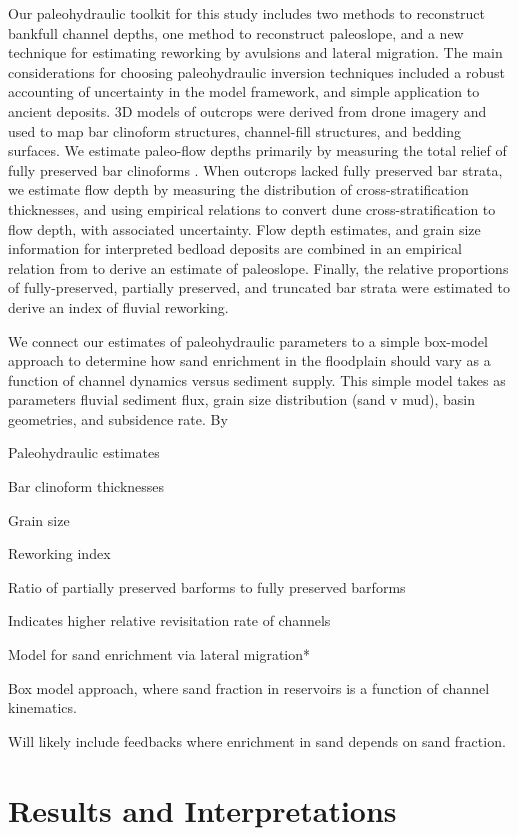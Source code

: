 \documentclass[draft]{compact_proposal}
\begin{document}
Our paleohydraulic toolkit for this study includes two methods to reconstruct bankfull channel depths, one method to reconstruct paleoslope, and a new technique for estimating reworking by avulsions and lateral migration.
The main considerations for choosing paleohydraulic inversion techniques included a robust accounting of uncertainty in the model framework, and simple application to ancient deposits.
3D models of outcrops were derived from drone imagery and used to map bar clinoform structures, channel-fill structures, and bedding surfaces.
We estimate paleo-flow depths primarily by measuring the total relief of fully preserved bar clinoforms .
When outcrops lacked fully preserved bar strata, we estimate flow depth by measuring the distribution of cross-stratification thicknesses, and using empirical relations to convert dune cross-stratification to flow depth, with associated uncertainty.
Flow depth estimates, and grain size information for interpreted bedload deposits are combined in an empirical relation from \cnote[trampush] to derive an estimate of paleoslope.
Finally, the relative proportions of fully-preserved, partially preserved, and truncated bar strata were estimated to derive an index of fluvial reworking.

We connect our estimates of paleohydraulic parameters to a simple box-model approach to determine how sand enrichment in the floodplain should vary as a function of channel dynamics versus sediment supply.
This simple model takes as parameters fluvial sediment flux, grain size distribution (sand v mud), basin geometries, and subsidence rate.
By 

Paleohydraulic estimates

  Bar clinoform thicknesses

  Grain size

  Reworking index

    Ratio of partially preserved barforms to fully preserved barforms

    Indicates higher relative revisitation rate of channels

Model for sand enrichment via lateral migration*

  Box model approach, where sand fraction in reservoirs is a function of channel kinematics.

  Will likely include feedbacks where enrichment in sand depends on sand fraction.

\section{Results and Interpretations}
\end{document}

